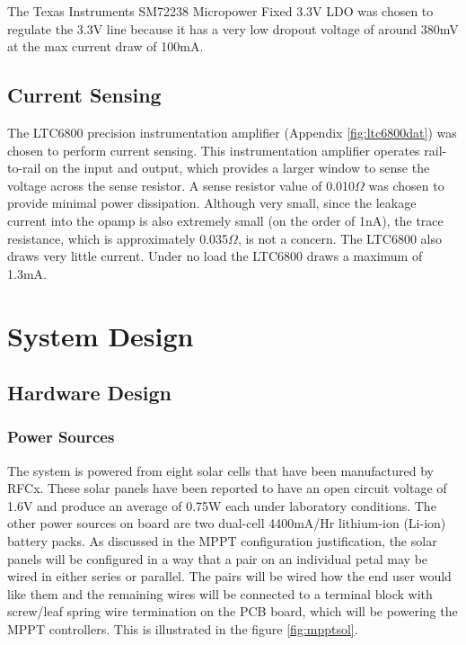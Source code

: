 \documentclass{article}
\numberwithin{figure}{section}
\numberwithin{equation}{section}
\begin{document}
{\bigskip
The Texas Instruments SM72238 Micropower Fixed 3.3V LDO was chosen to regulate the 3.3V line because it has a very low dropout voltage of around 380mV at the max current draw of 100mA.

\subsection{Current Sensing} \label{sect:cur_just}
The LTC6800 precision instrumentation amplifier (Appendix \ref{fig:ltc6800dat}) was chosen to perform current sensing. This instrumentation amplifier operates rail-to-rail on the input and output, which provides a larger window to sense the voltage across the sense resistor. A sense resistor value of 0.010$\Omega$ was chosen to provide minimal power dissipation. Although very small, since the leakage current into the opamp is also extremely small (on the order of 1nA), the trace resistance, which is approximately 0.035$\Omega$, is not a concern. The LTC6800 also draws very little current. Under no load the LTC6800 draws a maximum of 1.3mA.

\section{System Design} \label{sect:sysarch}
\subsection{Hardware Design} \label{sect:hardwaredesign}

\subsubsection{Power Sources}

The system is powered from eight solar cells that have been manufactured by RFCx. These solar panels have been reported to have an open circuit voltage of 1.6V and produce an average of 0.75W each under laboratory conditions. The other power sources on board are two dual-cell 4400mA/Hr lithium-ion (Li-ion) battery packs. As discussed in the MPPT configuration justification, the solar panels will be configured in a way that a pair on an individual petal may be wired in either series or parallel. The pairs will be wired how the end user would like them and the remaining wires will be connected to a terminal block with screw/leaf spring wire termination on the PCB board, which will be powering the MPPT controllers. This is illustrated in the figure \ref{fig:mpptsol}.

}
\end{document}
